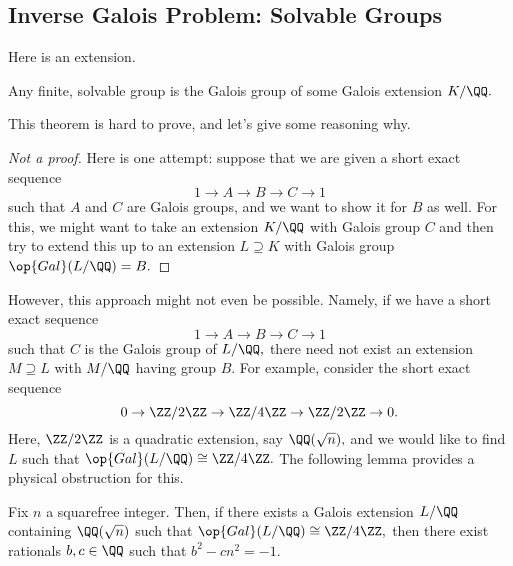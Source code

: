 \subsection{Inverse Galois Problem: Solvable Groups}
Here is an extension.
\begin{theorem}[Shafarevich]
	Any finite, solvable group is the Galois group of some Galois extension $K/\QQ.$
\end{theorem}
This theorem is hard to prove, and let's give some reasoning why.
\begin{proof}[Not a proof]
	Here is one attempt: suppose that we are given a short exact sequence
	\[1\to A\to B\to C\to 1\]
	such that $A$ and $C$ are Galois groups, and we want to show it for $B$ as well. For this, we might want to take an extension $K/\QQ$ with Galois group $C$ and then try to extend this up to an extension $L\supseteq K$ with Galois group $\op{Gal}(L/\QQ)=B.$
\end{proof}
However, this approach might not even be possible. Namely, if we have a short exact sequence
\[1\to A\to B\to C\to 1\]
such that $C$ is the Galois group of $L/\QQ,$ there need not exist an extension $M\supseteq L$ with $M/\QQ$ having group $B.$ For example, consider the short exact sequence
\[0\to\ZZ/2\ZZ\to\ZZ/4\ZZ\to\ZZ/2\ZZ\to0.\]
Here, $\ZZ/2\ZZ$ is a quadratic extension, say $\QQ(\sqrt n),$ and we would like to find $L$ such that $\op{Gal}(L/\QQ)\cong\ZZ/4\ZZ.$ The following lemma provides a physical obstruction for this.
\begin{lemma}
	Fix $n$ a squarefree integer. Then, if there exists a Galois extension $L/\QQ$ containing $\QQ(\sqrt n)$ such that $\op{Gal}(L/\QQ)\cong\ZZ/4\ZZ,$ then there exist rationals $b,c\in\QQ$ such that $b^2-cn^2=-1.$
\end{lemma}
